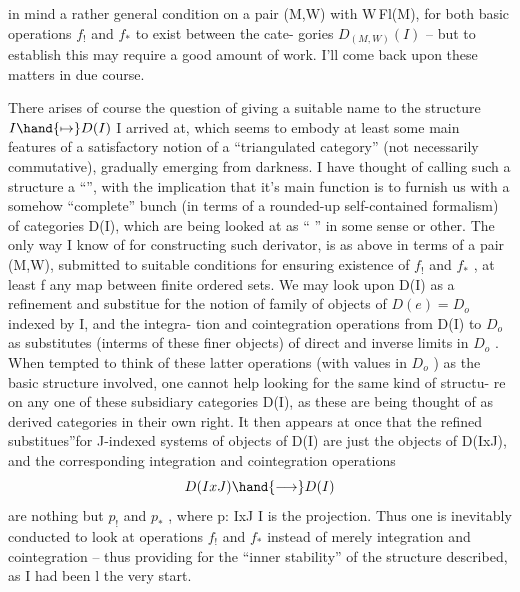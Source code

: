  in
 mind a rather general condition on a pair (M,W) with W\hand{$\subset$}\,Fl(M), for
both basic operations $f_!$ and $f_*$ to exist between the  cate-%
gories $D_{(M,W)}(I)$ -- but to establish this   may require a good amount
of work. I'll come back upon these matters in due course.

There arises of course the question of giving a suitable name to the
structure $I \hand{\mapsto} D(I)$ I arrived at, which seems to embody at least some
main features of a satisfactory notion of a ``triangulated category'' (not
necessarily commutative), gradually emerging from darkness. I have
thought of calling such a structure a ``\hand{\uline{\textcolor{black}{derivator}}}'', with the implication
that it's main function is to furnish us with a somehow\hand{,} ``complete'' bunch
(in terms of a rounded-up self-contained formalism) of categories D(I),
which are being looked at as ``\hand{\uline{\textcolor{black}{derived}}} \hand{\uline{\textcolor{black}{categories}}}'' in some sense or other.
The only way I know of for constructing such derivator, is as above in
terms of a pair (M,W), submitted to suitable conditions for ensuring
existence of $f_!$ and $f_*$ , at least  f  any map between finite ordered
sets. We may look upon D(I) as a  refinement and substitue for the
notion of family of objects of $D(e) = D_o$ indexed by I, and the integra-%
tion and cointegration operations from D(I) to $D_o$ as substitutes (interms
of these finer objects) of direct and inverse limits in $D_o$ . When tempted
to think of these latter operations (with values in $D_o$ ) as the basic
structure involved, one cannot help  looking for the same kind of structu-%
re on any one of these subsidiary categories D(I), as these are being
thought of as derived categories in their own right. It then appears at
once that the  refined substitues''\hand{/}for J-indexed systems of objects of D(I)
are just the objects of D(IxJ), and the corresponding integration and
cointegration operations
\[ D(IxJ) \hand{\longrightarrow} D(I) \]
are nothing but $p_!$ and $p_*$ , where p: IxJ \hand{$\longrightarrow$} I is the projection. Thus
one is inevitably conducted to look at operations $f_!$ and $f_*$ instead of
merely integration and cointegration -- thus providing for the ``inner
stability'' of the structure described, as I had been l
the very start.

